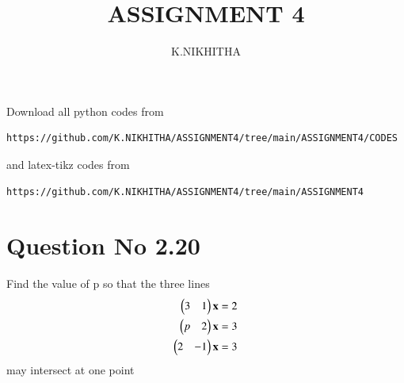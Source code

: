 \documentclass[journal,12pt,twocolumn]{IEEEtran}
\begin{document}
     \def\rightbox#1{\makebox[0in][r]{#1}}
     \def\centbox#1{\makebox[0in]{#1}}
     \def\topbox#1{\raisebox{-\baselineskip}[0in][0in]{#1}}
     \def\midbox#1{\raisebox{-0.5\baselineskip}[0in][0in]{#1}}
\vspace{3cm}
\title{ASSIGNMENT 4}
\author{K.NIKHITHA}
\maketitle
\newpage
\bigskip
\renewcommand{\thefigure}{\theenumi}
\renewcommand{\thetable}{\theenumi}
Download all python codes from 
\begin{lstlisting}
https://github.com/K.NIKHITHA/ASSIGNMENT4/tree/main/ASSIGNMENT4/CODES
\end{lstlisting}
%
and latex-tikz codes from 
%
\begin{lstlisting}
https://github.com/K.NIKHITHA/ASSIGNMENT4/tree/main/ASSIGNMENT4
\end{lstlisting}
%
\section{Question No 2.20}
Find the value of p so that the three lines
%
\begin{align}
 \begin{pmatrix}3 & 1\end{pmatrix}\mathbf{x}&=2 
\\
 \begin{pmatrix}p & 2 \end{pmatrix}\mathbf{x}&=3 
\\
 \begin{pmatrix}2 & -1\end{pmatrix}\mathbf{x}&=3 
\end{align}
may intersect at one point

%
\end{document}
